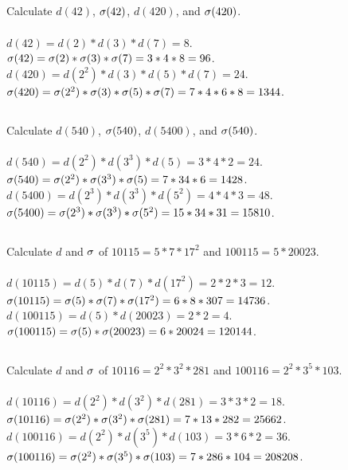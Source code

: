 \documentclass{article}
\begin{document}
\subsection{}
Calculate $d(42)$, $\sigma(42)$, $d(420)$, and $\sigma(420)$.\\~\\
$d(42) = d(2)*d(3)*d(7) = 8$.\\
$\sigma(42) = \sigma(2)*\sigma(3)*\sigma(7) = 3 * 4 * 8 = 96$.\\
$d(420) = d(2^2)*d(3)*d(5)*d(7) = 24$.\\
$\sigma(420) = \sigma(2^2)*\sigma(3)*\sigma(5)*\sigma(7) = 7 * 4 * 6 * 8 = 1344$.

\subsection{}
Calculate $d(540)$, $\sigma(540)$, $d(5400)$, and $\sigma(540)$.\\~\\
$d(540) = d(2^2)*d(3^3)*d(5) = 3 * 4 * 2 = 24$.\\
$\sigma(540) = \sigma(2^2)*\sigma(3^3)*\sigma(5) = 7 * 34 * 6 = 1428$.\\
$d(5400) = d(2^3)*d(3^3)*d(5^2) = 4 * 4 * 3 = 48$.\\
$\sigma(5400) = \sigma(2^3)*\sigma(3^3)*\sigma(5^2) = 15 * 34 * 31 = 15810$.\\

\subsection{}
Calculate $d$ and $\sigma$ of $10115 = 5 * 7 * 17^2$ and $100115 = 5 * 20023$.\\~\\
$d(10115) = d(5)*d(7)*d(17^2) = 2 * 2 * 3 = 12$.\\
$\sigma(10115) = \sigma(5)*\sigma(7)*\sigma(17^2) = 6 * 8 * 307 = 14736$.\\
$d(100115) = d(5)*d(20023) = 2 * 2 = 4$.\\
$\sigma(100115) = \sigma(5)*\sigma(20023) = 6 * 20024 = 120144$.

\subsection{}
Calculate $d$ and $\sigma$ of $10116 = 2^2 * 3^2 * 281$ and $100116 = 2^2 * 3^5 * 103$.\\~\\
$d(10116) = d(2^2)*d(3^2)*d(281) = 3 * 3 * 2 = 18$.\\
$\sigma(10116) = \sigma(2^2)*\sigma(3^2)*\sigma(281) = 7 * 13 * 282 = 25662$.\\
$d(100116) = d(2^2)*d(3^5)*d(103) = 3 * 6 * 2 = 36$.\\
$\sigma(100116) = \sigma(2^2)*\sigma(3^5)*\sigma(103) = 7 * 286 * 104 = 208208$.\\
\end{document}
